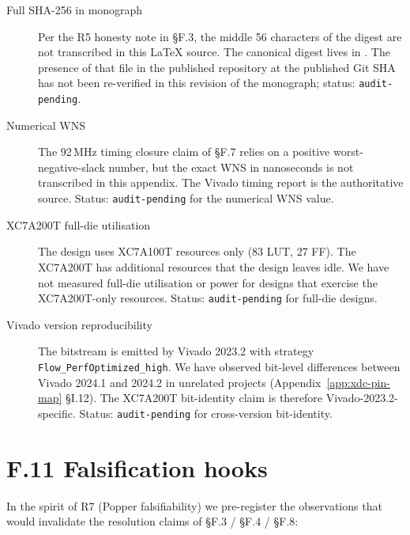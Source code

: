 \begin{description}
  \item[Full SHA-256 in monograph] Per the R5 honesty note in \S F.3,
    the middle 56 characters of the digest are not transcribed in this
    LaTeX source. The canonical digest lives in
    . The presence
    of that file in the published 
    repository at the published Git SHA has not been re-verified in
    this revision of the monograph; status: \texttt{audit-pending}.
  \item[Numerical WNS] The 92\,MHz timing closure claim of \S F.7
    relies on a positive worst-negative-slack number, but the exact
    WNS in nanoseconds is not transcribed in this appendix. The
    Vivado timing report is the authoritative source. Status:
    \texttt{audit-pending} for the numerical WNS value.
  \item[XC7A200T full-die utilisation] The design uses XC7A100T
    resources only (83 LUT, 27 FF). The XC7A200T has additional
    resources that the design leaves idle. We have not measured
    full-die utilisation or power for designs that exercise the
    XC7A200T-only resources. Status: \texttt{audit-pending} for
    full-die designs.
  \item[Vivado version reproducibility] The bitstream is emitted by
    Vivado 2023.2 with strategy \texttt{Flow\_PerfOptimized\_high}.
    We have observed bit-level differences between Vivado 2024.1
    and 2024.2 in unrelated projects (Appendix~\ref{app:xdc-pin-map}
    \S I.12). The XC7A200T bit-identity claim is therefore
    Vivado-2023.2-specific. Status: \texttt{audit-pending} for
    cross-version bit-identity.
\end{description}

\section*{F.11 Falsification hooks}
\label{sec:appF-falsify}

In the spirit of R7 (Popper falsifiability) we pre-register the
observations that would invalidate the resolution claims of \S F.3 /
\S F.4 / \S F.8:

